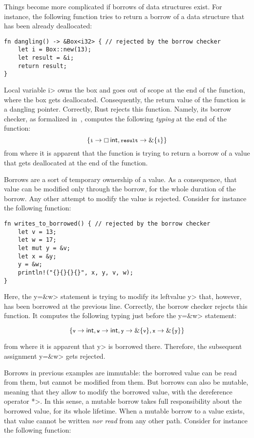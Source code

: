 Things become more complicated if borrows of data structures exist.
For instance, the following function tries to return a borrow of
a data structure that has been already deallocated:

\begin{verbatim}
fn dangling() -> &Box<i32> { // rejected by the borrow checker
    let i = Box::new(13);
    let result = &i;
    return result;
}
\end{verbatim}

\noindent
Local variable \<i> owns the box and goes out of scope at the end of the
function, where the box gets deallocated. Consequently, the return value of
the function is a dangling pointer. Correctly, Rust rejects this function.
Namely, its borrow checker, as formalized in~\cite{Pearce21}, computes the
following \emph{typing} at the end of the function:
\[
\{\<i>\to\boxtype{\mathsf{int},\<result>\to\borrow\{\<i>\}}\}
\]
from where it is apparent that the function is trying to return a borrow
of a value that gets deallocated at the end of the function.

Borrows are a sort of temporary ownership of a value. As a consequence,
that value can be modified only through the borrow, for the whole
duration of the borrow. Any other attempt to modify the value is rejected.
Consider for instance the following function:

\begin{verbatim}
fn writes_to_borrowed() { // rejected by the borrow checker
    let v = 13;
    let w = 17;
    let mut y = &v;
    let x = &y;
    y = &w;
    println!("{}{}{}{}", x, y, v, w);
}
\end{verbatim}

\noindent
Here, the \<y=\&w> statement is trying to modify its leftvalue \<y>
that, however, has been borrowed at the previous line. Correctly, the borrow
checker rejects this function. It computes the following typing
just before the \<y=\&w> statement:

\[
\{\<v>\to\mathsf{int},\<w>\to\mathsf{int},\<y>\to\borrow\{\<v>\},\<x>\to\borrow\{\<y>\}\}
\]

\noindent
from where it is apparent that \<y> is borrowed there. Therefore,
the subsequent assignment \<y=\&w> gets rejected.

Borrows in previous examples are immutable: the borrowed value can be read
from them, but cannot be modified from them.
But borrows can also be mutable, meaning that they allow to modify the
borrowed value, with the dereference operator \<*>. In this sense,
a mutable borrow takes full responsibility about the borrowed value, for its
whole lifetime. When a mutable borrow to a value exists, that value cannot
be written \emph{nor read} from any other path. Consider for instance
the following function:

